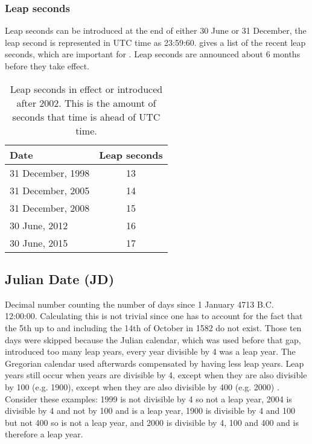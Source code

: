 \subsubsection{Leap seconds}

Leap seconds can be introduced at the end of either 30 June or 31
December, the leap second is represented in UTC time as 23:59:60.
 gives a list of the recent leap seconds,
which are important for \hisparc. Leap seconds are announced about 6
months before they take effect.

\begin{table}
    \centering
    \begin{tabular}{ l | c }
        Date & Leap seconds \\
        \hline
        31 December, 1998 & 13 \\
        31 December, 2005 & 14 \\
        31 December, 2008 & 15 \\
        30 June, 2012 & 16 \\
        30 June, 2015 & 17 \\
        \hline
    \end{tabular}
   \caption{Leap seconds in effect or introduced after 2002. This is the
            amount of seconds that \gps time is ahead of UTC time.}
   \label{table:leapseconds}
\end{table}


\subsection{Julian Date (JD)}

Decimal number counting the number of days since 1 January 4713 B.C.
12:00:00. Calculating this is not trivial since one has to account for
the fact that the 5th up to and including the 14th of October in 1582 do
not exist. Those ten days were skipped because the Julian calendar,
which was used before that gap, introduced too many leap years, every
year divisible by 4 was a leap year. The Gregorian calendar used
afterwards compensated by having less leap years. Leap years still occur
when years are divisible by 4, except when they are also divisible by
100 (e.g. 1900), except when they are also divisible by 400 (e.g. 2000)
\cite{acf:2014aa}. Consider these examples: 1999 is not divisible by 4
so not a leap year, 2004 is divisible by 4 and not by 100 and is a leap
year, 1900 is divisible by 4 and 100 but not 400 so is not a leap year,
and 2000 is divisible by 4, 100 and 400 and is therefore a leap year.

